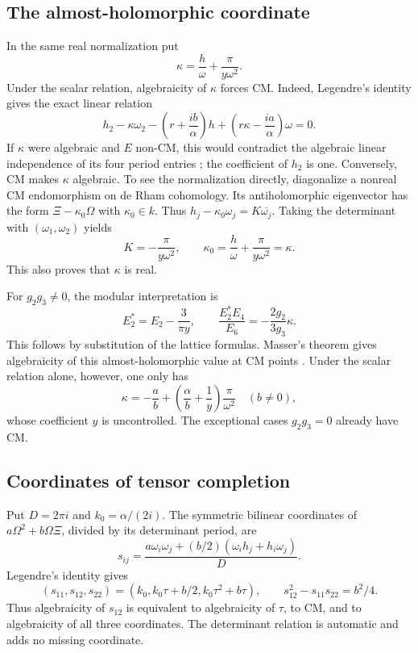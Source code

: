 \subsection{The almost-holomorphic coordinate}
In the same real normalization put
\[
 \kappa=\frac h\omega+\frac{\pi}{y\omega^2}.
\]
Under the scalar relation, algebraicity of $\kappa$ forces CM.  Indeed,
Legendre's identity gives the exact linear relation
\[
 h_2-\kappa\omega_2-\left(r+\frac{ib}{\alpha}\right)h
      +\left(r\kappa-\frac{ia}{\alpha}\right)\omega=0.
\]
If $\kappa$ were algebraic and $E$ non-CM, this would contradict
the algebraic linear independence of its four period entries
\cite[Section~5]{Waldschmidt}; the coefficient of $h_2$ is one.
Conversely, CM makes $\kappa$ algebraic.  To see the normalization
directly, diagonalize a nonreal CM endomorphism on de Rham cohomology.
Its antiholomorphic eigenvector has the form $\Xi-\kappa_0\Omega$
with $\kappa_0\in k$.  Thus
$h_j-\kappa_0\omega_j=K\overline{\omega_j}$.  Taking the determinant
with $(\omega_1,\omega_2)$ yields
\[
 K=-\frac\pi{y\omega^2},\qquad
 \kappa_0=\frac h\omega+\frac\pi{y\omega^2}=\kappa.
\]
This also proves that $\kappa$ is real.

For $g_2g_3\ne0$, the modular interpretation is
\[
 E_2^*=E_2-\frac3{\pi y},\qquad
 \frac{E_2^*E_4}{E_6}=-\frac{2g_2}{3g_3}\kappa.
\]
This follows by substitution of the lattice formulas.
Masser's theorem gives algebraicity of this almost-holomorphic value
at CM points \cite[Section~5]{Spence}.  Under the scalar relation
alone, however, one only has
\[
 \kappa=-\frac ab+\left(\frac\alpha b+\frac1y\right)
                      \frac\pi{\omega^2}\quad(b\ne0),
\]
whose coefficient $y$ is uncontrolled.  The exceptional cases
$g_2g_3=0$ already have CM.

\subsection{Coordinates of tensor completion}
Put $D=2\pi i$ and $k_0=\alpha/(2i)$.  The symmetric bilinear
coordinates of $a\Omega^2+b\Omega\Xi$, divided by its determinant
period, are
\[
 s_{ij}=\frac{a\omega_i\omega_j+
           (b/2)(\omega_i h_j+h_i\omega_j)}{D}.
\]
Legendre's identity gives
\begin{equation}\label{eq:comparison-coordinates}
 (s_{11},s_{12},s_{22})
       =(k_0,k_0\tau+b/2,k_0\tau^2+b\tau),\qquad
 s_{12}^2-s_{11}s_{22}=b^2/4.
\end{equation}
Thus algebraicity of $s_{12}$ is equivalent to algebraicity of
$\tau$, to CM, and to algebraicity of all three coordinates.  The
determinant relation is automatic and adds no missing coordinate.

